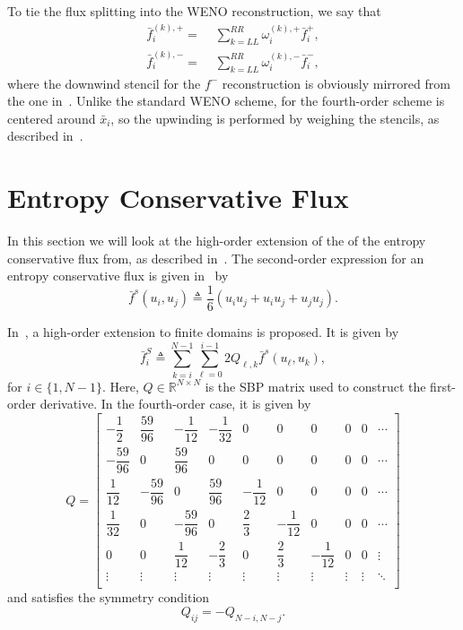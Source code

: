 \documentclass{scrartcl}
\begin{document}
To tie the flux splitting into the WENO reconstruction, we say that
\[
\begin{aligned}
\bar{f}^{(k), +}_i =\,\, & \sum_{k = LL}^{RR} \omega^{(k), +}_i \bar{f}^+_i, \\
\bar{f}^{(k), -}_i =\,\, & \sum_{k = LL}^{RR} \omega^{(k), -}_i \bar{f}^-_i,
\end{aligned}
\]
where the downwind stencil for the $f^-$ reconstruction is obviously mirrored
from the one in~. Unlike the standard WENO scheme,
for the fourth-order scheme is centered around $\bar{x}_i$, so the upwinding
is performed by weighing the stencils, as described in~.



\section{Entropy Conservative Flux} %
\label{sc:entropy}

In this section we will look at the high-order extension of the of the entropy
conservative flux from, as described in~\cite{Fisher2013}. The second-order
expression for an entropy conservative flux is given in~ by
\[
\bar{f}^s(u_i, u_j) \triangleq
    \frac{1}{6} (u_i u_j + u_i u_j + u_j u_j).
\]

In~\cite{Fisher2013}, a high-order extension to finite domains is proposed.
It is given by
\[
\bar{f}^{S}_i \triangleq \sum_{k = i}^{N - 1} \sum_{\ell = 0}^{i - 1}
2 Q_{\ell, k} \bar{f}^s(u_\ell, u_k),
\]
for $i \in \{1, N - 1\}$. Here, $Q \in \mathbb{R}^{N \times N}$ is the SBP
matrix used to construct the first-order derivative. In the fourth-order case,
it is given by~\cite[Equation A.2]{Fisher2013}
\[
Q =
\begin{bmatrix}
    -\dfrac{1}{2} & \dfrac{59}{96} & -\dfrac{1}{12} & -\dfrac{1}{32}
    & 0 & 0 & 0 & 0 & 0 & \cdots \\[1em]
    -\dfrac{59}{96} & 0 & \dfrac{59}{96}
    & 0 & 0 & 0 & 0 & 0 & 0 & \cdots \\[1em]
    \dfrac{1}{12} & -\dfrac{59}{96} & 0 & \dfrac{59}{96} & -\dfrac{1}{12}
    & 0 & 0 & 0 & 0 & \cdots \\[1em]
    \dfrac{1}{32} & 0 & -\dfrac{59}{96} & 0 & \dfrac{2}{3} & -\dfrac{1}{12}
    & 0 & 0 & 0 & \cdots \\[1em]
    0 & 0 & \dfrac{1}{12} & -\dfrac{2}{3} & 0 & \dfrac{2}{3} & -\dfrac{1}{12}
    & 0 & 0 & \vdots \\
    \vdots & \vdots & \vdots & \vdots & \vdots & \vdots & \vdots & \vdots & \vdots
    & \ddots \\[1em]
\end{bmatrix}
\]
and satisfies the symmetry condition
\[
Q_{ij} = -Q_{N - i, N - j}.
\]
\end{document}
